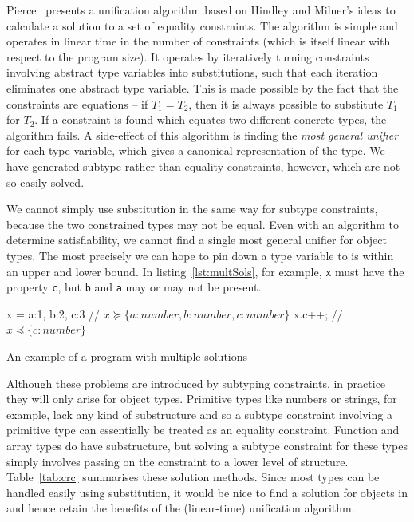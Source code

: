 \documentclass[12pt,a4paper,twoside,openright]{report}
\theoremstyle{definition}
\theoremstyle{dotless}
\newcommand*{\js}{\texttt}
\begin{document}
Pierce~\cite{pierce} presents a unification algorithm based on Hindley and
Milner's ideas to calculate a solution to a set of equality constraints. The
algorithm is simple and operates in linear time in the number of constraints
(which is itself linear with respect to the program size). It operates by
iteratively turning constraints involving abstract type variables into
substitutions, such that each iteration eliminates one abstract type variable.
This is made possible by the fact that the constraints are equations -- if
$T_1=T_2$, then it is always possible to substitute $T_1$ for $T_2$. If a
constraint is found which equates two different concrete types, the algorithm
fails. A side-effect of this algorithm is finding the \textit{most general
  unifier} for each type variable, which gives a canonical
representation of the type.  We have generated subtype rather than equality constraints, however,
which are not so easily solved.

We cannot simply use substitution in the same way for subtype constraints,
because the two constrained types may not be equal. Even with an algorithm to
determine satisfiability, we cannot find a single most general unifier for
object types.  The most precisely we can hope to pin down a type variable to is
within an upper and lower bound.  In listing~\ref{lst:multSols}, for example,
\js{x} must have the property \js{c}, but \js{b} and \js{a} may or may not be
present.  

\begin{listing}[H]
  \begin{jscript}
	x = {a:1, b:2, c:3} // $x \succeq \{a:number, b:number, c:number\}$
	x.c++;              // $x \preceq \{c:number\}$
  \end{jscript}
  \caption{An example of a program with multiple solutions}\label{lst:multSols}
\end{listing}

Although these problems are introduced by subtyping constraints, in practice
they will only arise for object types. Primitive types like numbers or strings,
for example, lack any kind of substructure and so a subtype constraint
involving a primitive type can essentially be treated as an equality
constraint. Function and array types do have substructure, but solving a
subtype constraint for these types simply involves passing on the constraint to
a lower level of structure. Table~\ref{tab:crc} summarises these solution
methods. Since most types can be handled easily using substitution, it would be
nice to find a solution for objects in and hence retain the benefits of the
(linear-time) unification algorithm. 
\end{document}
